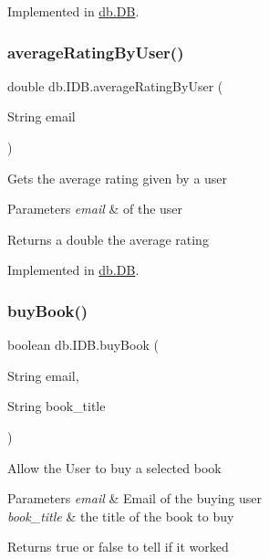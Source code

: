 Implemented in \hyperlink{classdb_1_1_d_b_a8b2b9d6c4aabb17719e2d2af4cf7ba74}{db.\+DB}.

\mbox{\label{interfacedb_1_1_i_d_b_a5bb2209c976ab0a7f20606ed5df0e0cf}} 
\subsubsection{\texorpdfstring{average\+Rating\+By\+User()}{averageRatingByUser()}}
{\footnotesize\ttfamily double db.\+I\+D\+B.\+average\+Rating\+By\+User (\begin{DoxyParamCaption}\item[{String}]{email }\end{DoxyParamCaption})}

Gets the average rating given by a user 
\begin{DoxyParams}{Parameters}
{\em email} & of the user \\
\hline
\end{DoxyParams}
\begin{DoxyReturn}{Returns}
a double the average rating 
\end{DoxyReturn}


Implemented in \hyperlink{classdb_1_1_d_b_a38091677ae1e964a84320d6e539ea62e}{db.\+DB}.

\mbox{\label{interfacedb_1_1_i_d_b_a2ac985a90e8369fab676950b3fb4c2bc}} 
\subsubsection{\texorpdfstring{buy\+Book()}{buyBook()}}
{\footnotesize\ttfamily boolean db.\+I\+D\+B.\+buy\+Book (\begin{DoxyParamCaption}\item[{String}]{email,  }\item[{String}]{book\+\_\+title }\end{DoxyParamCaption})}

Allow the User to buy a selected book 
\begin{DoxyParams}{Parameters}
{\em email} & Email of the buying user \\
\hline
{\em book\+\_\+title} & the title of the book to buy \\
\hline
\end{DoxyParams}
\begin{DoxyReturn}{Returns}
true or false to tell if it worked 
\end{DoxyReturn}


